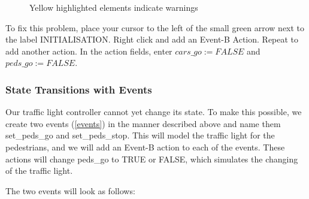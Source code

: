 \begin{figure}[!ht]
\begin{center}
	\caption{Yellow highlighted elements indicate warnings}
	\label{fig_tut_03_warning}
\end{center}
\end{figure}

To fix this problem, place your cursor to the left of the small green arrow next to the label \textsf{INITIALISATION}. Right click and add an \textsf{Event-B Action}. Repeat to add another action. In the action fields, enter $cars\_go :=  FALSE$ and $peds\_go :=  FALSE$.



\subsubsection{State Transitions with Events}

Our traffic light controller cannot yet change its state.  To make this possible, we create two events (\ref{events}) in the manner described above and name them \textsf{set\_peds\_go} and \textsf{set\_peds\_stop}. This will model the traffic light for the pedestrians, and we will add an Event-B action to each of the events. These actions will change \textsf{peds\_go} to \textsf{TRUE} or \textsf{FALSE}, which simulates the changing of the traffic light.


The two events will look as follows:


